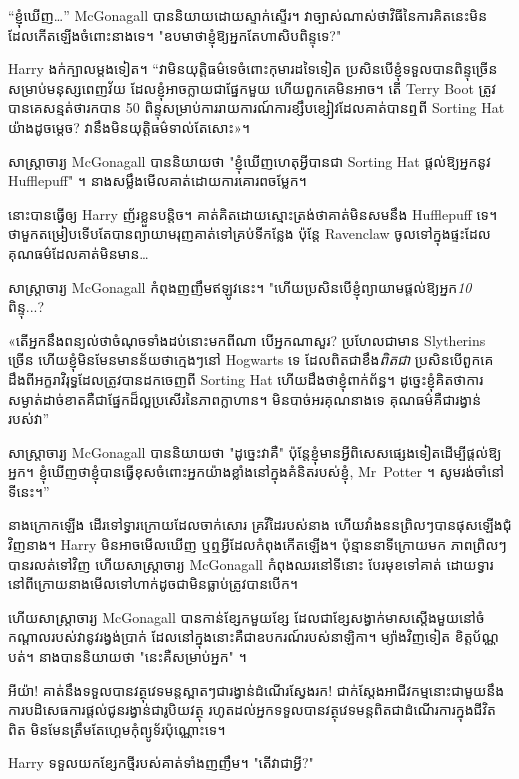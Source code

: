 “ខ្ញុំឃើញ…” McGonagall បាននិយាយដោយស្ទាក់ស្ទើរ។ វាច្បាស់ណាស់ថាវិធីនៃការគិតនេះមិនដែលកើតឡើងចំពោះនាងទេ។ "ឧបមាថាខ្ញុំឱ្យអ្នកតែហាសិបពិន្ទុទេ?"

Harry ងក់ក្បាលម្តងទៀត។ “វាមិនយុត្តិធម៌ទេចំពោះកុមារដទៃទៀត ប្រសិនបើខ្ញុំទទួលបានពិន្ទុច្រើនសម្រាប់មនុស្សពេញវ័យ ដែលខ្ញុំអាចក្លាយជាផ្នែកមួយ ហើយពួកគេមិនអាច។ តើ Terry Boot ត្រូវបានគេសន្មត់ថារកបាន 50 ពិន្ទុសម្រាប់ការរាយការណ៍ការខ្សឹបខ្សៀវដែលគាត់បានឮពី Sorting Hat យ៉ាងដូចម្តេច? វា​នឹង​មិន​យុត្តិធម៌​ទាល់​តែ​សោះ»។

សាស្រ្តាចារ្យ McGonagall បាននិយាយថា "ខ្ញុំឃើញហេតុអ្វីបានជា Sorting Hat ផ្តល់ឱ្យអ្នកនូវ Hufflepuff" ។ នាងសម្លឹងមើលគាត់ដោយការគោរពចម្លែក។

នោះ​បាន​ធ្វើ​ឲ្យ Harry ញ័រ​ខ្លួន​បន្តិច។ គាត់គិតដោយស្មោះត្រង់ថាគាត់មិនសមនឹង Hufflepuff ទេ។ ថាមួកតម្រៀបទើបតែបានព្យាយាមរុញគាត់ទៅគ្រប់ទីកន្លែង ប៉ុន្តែ Ravenclaw ចូលទៅក្នុងផ្ទះដែលគុណធម៌ដែលគាត់មិនមាន…

សាស្រ្តាចារ្យ McGonagall កំពុងញញឹមឥឡូវនេះ។ "ហើយប្រសិនបើខ្ញុំព្យាយាមផ្តល់ឱ្យអ្នក\emph{10} ពិន្ទុ...?

«តើ​អ្នក​នឹង​ពន្យល់​ថា​ចំណុច​ទាំង​ដប់​នោះ​មក​ពី​ណា បើ​អ្នក​ណា​សួរ? ប្រហែលជាមាន Slytherins ច្រើន ហើយខ្ញុំមិនមែនមានន័យថាក្មេងៗនៅ Hogwarts ទេ ដែលពិតជាខឹង\emph{ពិតជា} ប្រសិនបើពួកគេដឹងពីអក្ខរាវិរុទ្ធដែលត្រូវបានដកចេញពី Sorting Hat ហើយដឹងថាខ្ញុំពាក់ព័ន្ធ។ ដូច្នេះ​ខ្ញុំ​គិត​ថា​ការ​សម្ងាត់​ដាច់​ខាត​គឺ​ជា​ផ្នែក​ដ៏​ល្អ​ប្រសើរ​នៃ​ភាព​ក្លាហាន។ មិនបាច់អរគុណនាងទេ គុណធម៌គឺជារង្វាន់របស់វា”

សាស្រ្តាចារ្យ McGonagall បាននិយាយថា "ដូច្នេះវាគឺ" ប៉ុន្តែខ្ញុំមានអ្វីពិសេសផ្សេងទៀតដើម្បីផ្តល់ឱ្យអ្នក។ ខ្ញុំឃើញថាខ្ញុំបានធ្វើខុសចំពោះអ្នកយ៉ាងខ្លាំងនៅក្នុងគំនិតរបស់ខ្ញុំ, Mr~Potter ។ សូមរង់ចាំនៅទីនេះ។”

នាងក្រោកឡើង ដើរទៅទ្វារក្រោយដែលចាក់សោរ គ្រវីដៃរបស់នាង ហើយវាំងននព្រិលៗបានផុសឡើងជុំវិញនាង។ Harry មិន​អាច​មើល​ឃើញ ឬ​ឮ​អ្វី​ដែល​កំពុង​កើត​ឡើង។ ប៉ុន្មាននាទីក្រោយមក ភាពព្រិលៗបានរលត់ទៅវិញ ហើយសាស្រ្តាចារ្យ McGonagall កំពុងឈរនៅទីនោះ បែរមុខទៅគាត់ ដោយទ្វារនៅពីក្រោយនាងមើលទៅហាក់ដូចជាមិនធ្លាប់ត្រូវបានបើក។

ហើយសាស្រ្តាចារ្យ McGonagall បានកាន់ខ្សែកមួយខ្សែ ដែលជាខ្សែសង្វាក់មាសស្តើងមួយនៅចំកណ្តាលរបស់វានូវរង្វង់ប្រាក់ ដែលនៅក្នុងនោះគឺជាឧបករណ៍របស់នាឡិកា។ ម្យ៉ាងវិញទៀត ខិត្តប័ណ្ណបត់។ នាងបាននិយាយថា "នេះគឺសម្រាប់អ្នក" ។

អីយ៉ា! គាត់​នឹង​ទទួល​បាន​វត្ថុ​វេទមន្ត​ស្អាត​ៗ​ជា​រង្វាន់​ដំណើរ​ស្វែងរក! ជាក់ស្តែងអាជីវកម្មនោះជាមួយនឹងការបដិសេធការផ្តល់ជូនរង្វាន់ជារូបិយវត្ថុ រហូតដល់អ្នកទទួលបានវត្ថុវេទមន្តពិតជាដំណើរការក្នុងជីវិតពិត មិនមែនត្រឹមតែហ្គេមកុំព្យូទ័រប៉ុណ្ណោះទេ។

Harry ទទួលយកខ្សែកថ្មីរបស់គាត់ទាំងញញឹម។ "តើវាជាអ្វី?"


